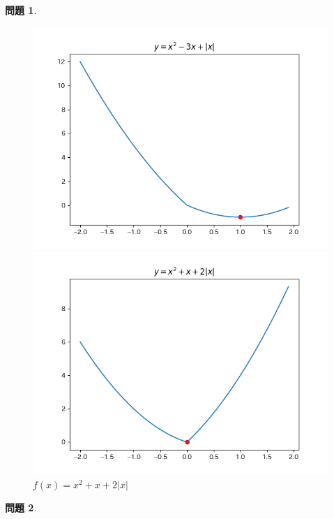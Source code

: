 \documentclass[titlepage]{jsarticle}
\theoremstyle{definition}
\newtheorem{Ex}{問題}
\theoremstyle{mystyle} %
\begin{document}
\begin{Ex}
\begin{figure}[H]
  \begin{minipage}[]{0.52\linewidth}
    \centering
    \includegraphics[keepaspectratio, scale=0.43]{mondai5(1).png}
    \caption{$f(x)=x^2-3x+|x|$}
  \end{minipage}
  \begin{minipage}[]{0.52\linewidth}
    \centering
    \includegraphics[keepaspectratio, scale=0.43]{mondai5(2).png}
    \caption{$f(x)=x^2+x+2|x|$}
  \end{minipage}
\end{figure}
\end{Ex}
\begin{Ex}

\end{Ex}
\end{document}
